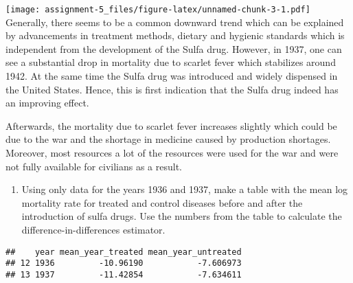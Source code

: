 \documentclass[
]{article}
\newenvironment{Shaded}{\begin{snugshade}}{\end{snugshade}}
\newcommand{\DecValTok}[1]{\textcolor[rgb]{0.00,0.00,0.81}{#1}}
\newcommand{\NormalTok}[1]{#1}
\newcommand{\SpecialCharTok}[1]{\textcolor[rgb]{0.00,0.00,0.00}{#1}}
\providecommand{\tightlist}{%
  \setlength{\itemsep}{0pt}\setlength{\parskip}{0pt}}
\begin{document}
\texttt{[image: assignment-5\_files/figure-latex/unnamed-chunk-3-1.pdf]}
Generally, there seems to be a common downward trend which can be
explained by advancements in treatment methods, dietary and hygienic
standards which is independent from the development of the Sulfa drug.
However, in 1937, one can see a substantial drop in mortality due to
scarlet fever which stabilizes around 1942. At the same time the Sulfa
drug was introduced and widely dispensed in the United States. Hence,
this is first indication that the Sulfa drug indeed has an improving
effect.

Afterwards, the mortality due to scarlet fever increases slightly which
could be due to the war and the shortage in medicine caused by
production shortages. Moreover, most resources a lot of the resources
were used for the war and were not fully available for civilians as a
result.

\begin{enumerate}
\def\labelenumi{\roman{enumi})}
\setcounter{enumi}{1}
\tightlist
\item
  Using only data for the years 1936 and 1937, make a table with the
  mean log mortality rate for treated and control diseases before and
  after the introduction of sulfa drugs. Use the numbers from the table
  to calculate the difference-in-differences estimator.
\end{enumerate}

\begin{Shaded}
\end{Shaded}

\begin{verbatim}
##    year mean_year_treated mean_year_untreated
## 12 1936         -10.96190           -7.606973
## 13 1937         -11.42854           -7.634611
\end{verbatim}
\end{document}
